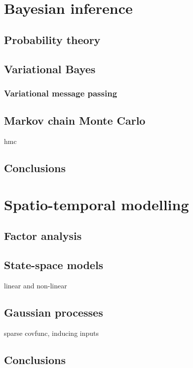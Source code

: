 \documentclass[dissertation,draft]{aaltoseries}
\begin{document}
\chapter{Bayesian inference}

\section{Probability theory}

\section{Variational Bayes}
\subsection{Variational message passing}

\section{Markov chain Monte Carlo}
hmc

\section{Conclusions}



\chapter{Spatio-temporal modelling}

\section{Factor analysis}

\section{State-space models}
linear and non-linear

\section{Gaussian processes}
sparse covfunc, inducing inputs

\section{Conclusions}
\end{document}
